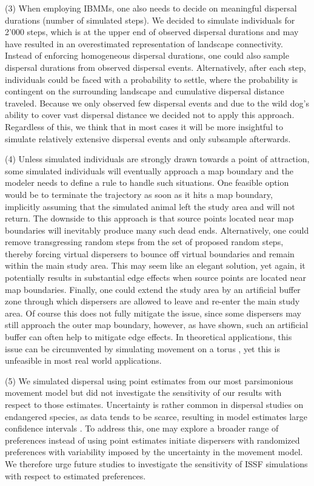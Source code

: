 \documentclass[abstract=on,10pt,a4paper,bibliography=totocnumbered]{article}
\begin{document}
(3) When employing IBMMs, one also needs to decide on meaningful dispersal
durations (number of simulated steps). We decided to simulate individuals for
2'000 steps, which is at the upper end of observed dispersal durations and may
have resulted in an overestimated representation of landscape connectivity.
Instead of enforcing homogeneous dispersal durations, one could also sample
dispersal durations from observed dispersal events. Alternatively, after each
step, individuals could be faced with a probability to settle, where the
probability is contingent on the surrounding landscape and cumulative dispersal
distance traveled. Because we only observed few dispersal events and due to the
wild dog's ability to cover vast dispersal distance \citep{DaviesMostert.2012,
Masenga.2016, Cozzi.2020} we decided not to apply this approach. Regardless of
this, we think that in most cases it will be more insightful to simulate
relatively extensive dispersal events and only subsample afterwards.

(4) Unless simulated individuals are strongly drawn towards a point of
attraction, some simulated individuals will eventually approach a map boundary
and the modeler needs to define a rule to handle such situations. One feasible
option would be to terminate the trajectory as soon as it hits a map boundary,
implicitly assuming that the simulated animal left the study area and will not
return. The downside to this approach is that source points located near map
boundaries will inevitably produce many such dead ends. Alternatively, one could
remove transgressing random steps from the set of proposed random steps, thereby
forcing virtual dispersers to bounce off virtual boundaries and remain within
the main study area. This may seem like an elegant solution, yet again, it
potentially results in substantial edge effects when source points are located
near map boundaries. Finally, one could extend the study area by an artificial
buffer zone through which dispersers are allowed to leave and re-enter the main
study area. Of course this does not fully mitigate the issue, since some
dispersers may still approach the outer map boundary, however, as
\cite{Koen.2010} have shown, such an artificial buffer can often help to
mitigate edge effects. In theoretical applications, this issue can be
circumvented by simulating movement on a torus \citep{Hodel.2021b}, yet this is
unfeasible in most real world applications.

(5) We simulated dispersal using point estimates from our most parsimonious
movement model but did not investigate the sensitivity of our results with
respect to those estimates. Uncertainty is rather common in dispersal studies on
endangered species, as data tends to be scarce, resulting in model estimates
large confidence intervals \citep{Wiegand.2003, KramerSchadt.2007}. To address
this, one may explore a broader range of preferences instead of using point
estimates initiate dispersers with randomized preferences with variability
imposed by the uncertainty in the movement model. We therefore urge future
studies to investigate the sensitivity of ISSF simulations with respect to
estimated preferences.
\end{document}
